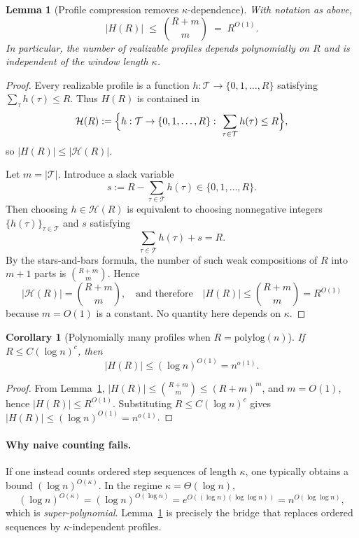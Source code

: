 \documentclass[12pt]{article}
\newcommand{\polylog}{\mathrm{polylog}}
\newtheorem{lemma}[theorem]{Lemma}
\newtheorem{corollary}[theorem]{Corollary}
\theoremstyle{definition}
\theoremstyle{definition}
\theoremstyle{remark}
\theoremstyle{remark}
\begin{document}
\begin{lemma}[Profile compression removes $\kappa$-dependence]
\label{lem:profile-compression-removes-k}
With notation as above,
\[
  |H(R)|
  \;\le\;
  \binom{R+m}{m}
  \;=\;
  R^{O(1)}.
\]
In particular, the number of realizable profiles depends polynomially on $R$ and
is \emph{independent of the window length $\kappa$}.
\end{lemma}

\begin{proof}
Every realizable profile is a function $h:\mathcal{T}\to\{0,1,\dots,R\}$ satisfying
$\sum_{\tau}h(\tau)\le R$. Thus $H(R)$ is contained in
\[
  \mathcal{H}(R)
  :=
  \Bigl\{h:\mathcal{T}\to\{0,1,\dots,R\}:\ \sum_{\tau\in\mathcal{T}} h(\tau)\le R\Bigr\},
\]
so $|H(R)|\le|\mathcal{H}(R)|$.

Let $m=|\mathcal{T}|$. Introduce a slack variable
\[
  s := R - \sum_{\tau\in\mathcal{T}} h(\tau)\in\{0,1,\dots,R\}.
\]
Then choosing $h\in\mathcal{H}(R)$ is equivalent to choosing nonnegative integers
$\{h(\tau)\}_{\tau\in\mathcal{T}}$ and $s$ satisfying
\[
  \sum_{\tau\in\mathcal{T}} h(\tau) + s = R.
\]
By the stars-and-bars formula, the number of such weak compositions of $R$ into
$m+1$ parts is $\binom{R+m}{m}$. Hence
\[
  |\mathcal{H}(R)| = \binom{R+m}{m},
\quad\text{and therefore}\quad
  |H(R)| \le \binom{R+m}{m} = R^{O(1)}
\]
because $m=O(1)$ is a constant. No quantity here depends on $\kappa$.
\end{proof}

\begin{corollary}[Polynomially many profiles when $R=\polylog(n)$]
\label{cor:poly-many-profiles}
If $R \le C(\log n)^c$, then
\[
  |H(R)| \le (\log n)^{O(1)} = n^{o(1)}.
\]
\end{corollary}

\begin{proof}
From Lemma~\ref{lem:profile-compression-removes-k},
$|H(R)|\le\binom{R+m}{m}\le(R+m)^m$, and $m=O(1)$, hence $|H(R)|\le R^{O(1)}$.
Substituting $R\le C(\log n)^c$ gives $|H(R)|\le(\log n)^{O(1)}=n^{o(1)}$.
\end{proof}

\paragraph{Why naive counting fails.}
If one instead counts ordered step sequences of length $\kappa$, one typically obtains a
bound $(\log n)^{O(\kappa)}$. In the regime $\kappa=\Theta(\log n)$,
\[
(\log n)^{O(\kappa)}
=
(\log n)^{O(\log n)}
=
e^{O((\log n)(\log\log n))}
=
n^{O(\log\log n)},
\]
which is \emph{super-polynomial}. Lemma~\ref{lem:profile-compression-removes-k}
is precisely the bridge that replaces ordered sequences by $\kappa$-independent profiles.
\end{document}
